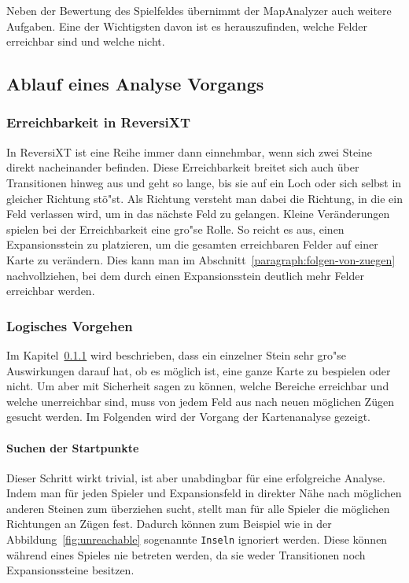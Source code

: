 Neben der Bewertung des Spielfeldes \"ubernimmt der MapAnalyzer auch weitere Aufgaben.
Eine der Wichtigsten davon ist es herauszufinden, welche Felder erreichbar sind und welche nicht.

\subsection{Ablauf eines Analyse Vorgangs}\label{subsec:analyse-vorgang}
\subsubsection{Erreichbarkeit in ReversiXT}\label{subsubsec:erreichbarkeit}
In ReversiXT ist eine Reihe immer dann einnehmbar, wenn sich zwei Steine direkt nacheinander befinden.
Diese Erreichbarkeit breitet sich auch \"uber Transitionen hinweg aus und geht so lange, bis sie auf ein Loch oder sich selbst in gleicher Richtung st\"o"st.
Als Richtung versteht man dabei die Richtung, in die ein Feld verlassen wird, um in das n\"achste Feld zu gelangen.
Kleine Ver\"anderungen spielen bei der Erreichbarkeit eine gro"se Rolle.
So reicht es aus, einen Expansionsstein zu platzieren, um die gesamten erreichbaren Felder auf einer Karte zu ver\"andern.
Dies kann man im Abschnitt~\ref{paragraph:folgen-von-zuegen} nachvollziehen, bei dem durch einen Expansionsstein deutlich mehr Felder erreichbar werden.

\subsubsection{Logisches Vorgehen}\label{subsubsec:logisches-vorgehen}
Im Kapitel~\ref{subsubsec:erreichbarkeit} wird beschrieben, dass ein einzelner Stein sehr gro"se Auswirkungen darauf hat, ob es m\"oglich ist, eine ganze Karte zu bespielen oder nicht.
Um aber mit Sicherheit sagen zu k\"onnen, welche Bereiche erreichbar und welche unerreichbar sind, muss von jedem Feld aus nach neuen m\"oglichen Z\"ugen gesucht werden.
Im Folgenden wird der Vorgang der Kartenanalyse gezeigt.

\paragraph{Suchen der Startpunkte}
Dieser Schritt wirkt trivial, ist aber unabdingbar f\"ur eine erfolgreiche Analyse.
Indem man f\"ur jeden Spieler und Expansionsfeld in direkter N\"ahe nach m\"oglichen anderen Steinen zum \"uberziehen sucht, stellt man f\"ur alle Spieler die m\"oglichen Richtungen an Z\"ugen fest.
Dadurch k\"onnen zum Beispiel wie in der Abbildung~\ref{fig:unreachable} sogenannte \texttt{Inseln} ignoriert werden.
Diese k\"onnen w\"ahrend eines Spieles nie betreten werden, da sie weder Transitionen noch Expansionssteine besitzen.

